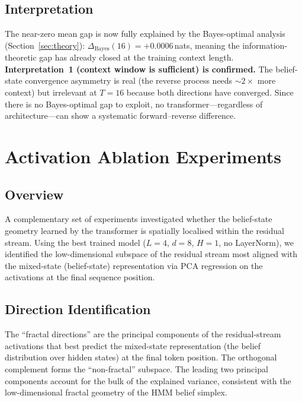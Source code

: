 \documentclass[11pt]{article}
\begin{document}
\subsection{Interpretation}

The near-zero mean gap is now fully explained by the Bayes-optimal analysis (Section~\ref{sec:theory}): $\Delta_{\mathrm{Bayes}}(16) = +0.0006$\,nats, meaning the information-theoretic gap has already closed at the training context length.  \textbf{Interpretation~1 (context window is sufficient) is confirmed.}  The belief-state convergence asymmetry is real (the reverse process needs $\sim 2\times$ more context) but irrelevant at $T = 16$ because both directions have converged.  Since there is no Bayes-optimal gap to exploit, no transformer---regardless of architecture---can show a systematic forward--reverse difference.

\section{Activation Ablation Experiments}\label{sec:ablation}

\subsection{Overview}

A complementary set of experiments investigated whether the belief-state geometry learned by the transformer is spatially localised within the residual stream.  Using the best trained model ($L = 4$, $d = 8$, $H = 1$, no LayerNorm), we identified the low-dimensional subspace of the residual stream most aligned with the mixed-state (belief-state) representation via PCA regression on the activations at the final sequence position.

\subsection{Direction Identification}

The ``fractal directions'' are the principal components of the residual-stream activations that best predict the mixed-state representation (the belief distribution over hidden states) at the final token position.  The orthogonal complement forms the ``non-fractal'' subspace.  The leading two principal components account for the bulk of the explained variance, consistent with the low-dimensional fractal geometry of the HMM belief simplex.
\end{document}
